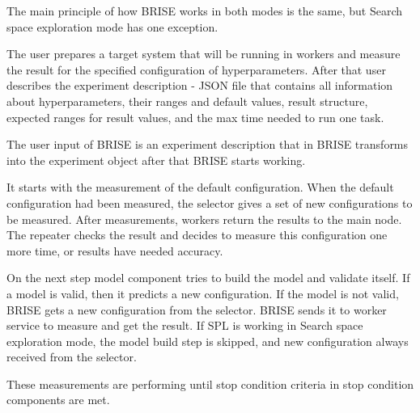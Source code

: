 The main principle of how BRISE works in both modes is the same, but 
Search space exploration mode has one exception.

The user prepares a target system that will be running in workers and measure the result for the specified configuration of hyperparameters.
After that user describes the experiment description - JSON file that contains all information about hyperparameters, their ranges and default values, result structure, expected ranges for result values, and the max time needed to run one task.

The user input of BRISE is an experiment description that in BRISE transforms into the experiment object after that BRISE starts working.

It starts with the measurement of the default configuration. When the default configuration had been measured, the selector gives a set of new configurations to be measured. After measurements, workers return the results to the main node. The repeater checks the result and decides to measure this configuration one more time, or results have needed accuracy. 

On the next step model component tries to build the model and validate itself. If a model is valid, then it predicts a new configuration. If the model is not valid, BRISE gets a new configuration from the selector. BRISE sends it to worker service to measure and get the result. If SPL is working in Search space exploration mode, the model build step is skipped, and new configuration always received from the selector. 

These measurements are performing until stop condition criteria in stop condition components are met.
